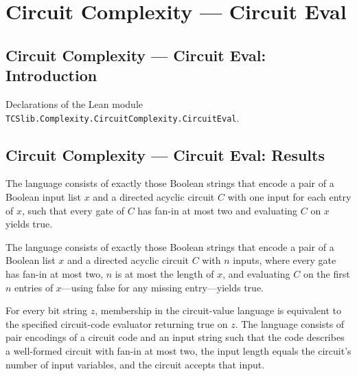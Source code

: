\section{Circuit Complexity --- Circuit Eval}
\subsection*{Circuit Complexity --- Circuit Eval: Introduction}

Declarations of the Lean module \texttt{TCSlib.Complexity.CircuitComplexity.CircuitEval}.

\subsection*{Circuit Complexity --- Circuit Eval: Results}

\begin{definition}
\label{BoolCircuit.CVAL}
\leanok
{}
The language consists of exactly those Boolean strings that encode a pair of a Boolean
input list $x$ and a directed acyclic circuit $C$ with one input for each entry of $x$,
such that every gate of $C$ has fan-in at most two and evaluating $C$ on $x$ yields
true.
\end{definition}

\begin{definition}
\label{BoolCircuit.CVALPrefix}
\leanok
{}
The language consists of exactly those Boolean strings that encode a pair of a Boolean
list $x$ and a directed acyclic circuit $C$ with $n$ inputs, where every gate has fan-in
at most two, $n$ is at most the length of $x$, and evaluating $C$ on the first $n$
entries of $x$—using false for any missing entry—yields true.
\end{definition}

\begin{theorem}
\label{BoolCircuit.mem_CVAL_iff}
\leanok
{}
For every bit string $z$, membership in the circuit-value language is equivalent to the
specified circuit-code evaluator returning true on $z$. The language consists of pair
encodings of a circuit code and an input string such that the code describes a
well-formed circuit with fan-in at most two, the input length equals the circuit's
number of input variables, and the circuit accepts that input.
\end{theorem}

